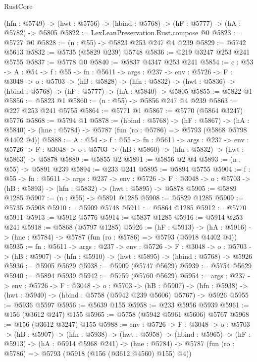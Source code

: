 \begin{lexlean}{RustCore}
\begin{coremodule}
  (hfn : @5749) -> (hwt : @5756) -> (hbind : @5768) -> (hF : @5777) -> (hA : @5782) -> @5805
@5822 := LexLeanPreservation.Rust.compose @0
@5823 := @5727 @0
@5828 := (n : @55) -> @5823 @253 @247 @4 @239
@5829 := @5742 @5613
@5832 := @5735 (@5829 @239) @5748
@5836 := @219 @3247 @253 @241 @5755
@5837 := @5778 @0
@5840 := @5837 @4347 @253 @241
@5854 := {c : @53} ->
  {A : @54} ->
  {f : @55} ->
  {fn : @5611} ->
  {args : @237} ->
  {env : @5726} ->
  {F : @3048} ->
  {o : @5703} ->
  (hB : @5828) ->
  (hfn : @5832) -> (hwt : @5836) -> (hbind : @5768) -> (hF : @5777) -> (hA : @5840) -> @5805
@5855 := @5822 @1
@5856 := @5823 @1
@5860 := (n : @55) -> @5856 @247 @4 @239
@5863 := @227 @253 @241 @5755
@5864 := @5771 @1
@5867 := @5770 (@5864 @3247) @5776
@5868 := @5794 @1
@5878 := (hbind : @5768) ->
  (hF : @5867) ->
  (hA : @5840) -> (hne : @5784) -> @5787 (fun (ro : @5786) => @5793 (@5868 @5798 @4402 @4))
@5888 := {A : @54} ->
  {f : @55} ->
  {fn : @5611} ->
  {args : @237} ->
  {env : @5726} ->
  {F : @3048} -> {o : @5703} -> (hB : @5860) -> (hfn : @5832) -> (hwt : @5863) -> @5878
@5889 := @5855 @2
@5891 := @5856 @2 @4
@5893 := (n : @55) -> @5891 @239
@5894 := @233 @241
@5895 := @5894 @5755
@5904 := {f : @55} ->
  {fn : @5611} ->
  {args : @237} ->
  {env : @5726} ->
  {F : @3048} -> {o : @5703} -> (hB : @5893) -> (hfn : @5832) -> (hwt : @5895) -> @5878
@5905 := @5889 @1285
@5907 := (n : @55) -> @5891 @1285
@5908 := @5829 @1285
@5909 := @5735 @5908
@5910 := @5909 @5748
@5911 := @5864 @1285
@5912 := @5770 @5911
@5913 := @5912 @5776
@5914 := @5837 @1285
@5916 := @5914 @253 @241
@5918 := @5868 (@5797 @1285)
@5926 := (hF : @5913) ->
  (hA : @5916) -> (hne : @5784) -> @5787 (fun (ro : @5786) => @5793 (@5918 @4402 @4))
@5935 := {fn : @5611} ->
  {args : @237} ->
  {env : @5726} ->
  {F : @3048} ->
  {o : @5703} -> (hB : @5907) -> (hfn : @5910) -> (hwt : @5895) -> (hbind : @5768) -> @5926
@5936 := @5905 @5629
@5938 := @5909 (@5747 @5629)
@5939 := @5754 @5629
@5940 := @5894 @5939
@5942 := @5759 (@5760 @5629)
@5954 := {args : @237} ->
  {env : @5726} ->
  {F : @3048} ->
  {o : @5703} ->
  (hB : @5907) ->
  (hfn : @5938) -> (hwt : @5940) -> (hbind : @5758 (@5942 @239 @5606) @5767) -> @5926
@5955 := @5936 @5597
@5956 := @5639 @155
@5958 := @233 @5956 @5939
@5961 := @156 (@3612 @247) @155
@5965 := @5758 (@5942 @5961 @5606) @5767
@5968 := @156 (@3612 @3247) @155
@5988 := {env : @5726} ->
  {F : @3048} ->
  {o : @5703} ->
  (hB : @5907) ->
  (hfn : @5938) ->
  (hwt : @5958) ->
  (hbind : @5965) ->
  (hF : @5913) ->
  (hA : @5914 @5968 @241) ->
  (hne : @5784) -> @5787 (fun (ro : @5786) => @5793 (@5918 (@156 (@3612 @4560) @155) @4))

\end{coremodule}
\end{lexlean}
